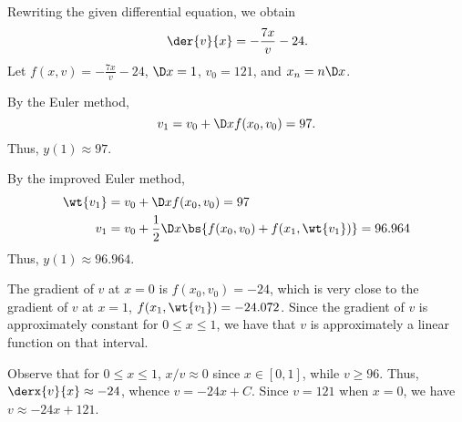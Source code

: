 \begin{problem}
    Rewriting the given differential equation, we obtain \[\der{v}{x} = -\frac{7x}{v} - 24.\] Let $f(x, v) = -\frac{7x}{v} - 24$, $\D x = 1$, $v_0 = 121$, and $x_n = n \D x$.
\end{problem}
\begin{solution}
    \begin{ppart}
        By the Euler method, \[v_1 = v_0 + \D x f(x_0, v_0) = 97.\] Thus, $y(1) \approx 97$.
    \end{ppart}
    \begin{ppart}
        By the improved Euler method,
        \begin{align*}
            \wt{v_1} &= v_0 + \D x f(x_0, v_0) = 97\\
            v_1 &= v_0 + \frac12 \D x \bs{f(x_0, v_0) + f(x_1, \wt{v_1})} = 96.964
        \end{align*}
        Thus, $y(1) \approx 96.964$.
    \end{ppart}

    The gradient of $v$ at $x = 0$ is $f(x_0, v_0) = -24$, which is very close to the gradient of $v$ at $x=1$, $f(x_1, \wt{v_1}) = -24.072$. Since the gradient of $v$ is approximately constant for $0 \leq x \leq 1$, we have that $v$ is approximately a linear function on that interval.

    Observe that for $0 \leq x \leq 1$, $x/v \approx 0$ since $x \in [0, 1]$, while $v \geq 96$. Thus, $\derx{v}{x} \approx -24$, whence $v = -24 x + C$. Since $v = 121$ when $x = 0$, we have $v \approx -24x + 121$.
\end{solution}

